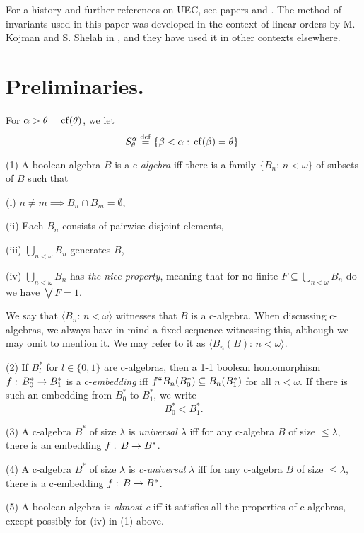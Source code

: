For a history and further references on UEC, see papers
\cite{Rudin} and \cite{Bell}. 
The method
of invariants used in this paper was developed in the context of linear orders
by M. Kojman and S. Shelah in \cite{KjSh 409}, and they have used it in other
contexts elsewhere.


\section{Preliminaries.}\label{basics}

\begin{Notation} For $\alpha>\theta={\rm cf}(\theta)$, we let
\[
S^\alpha_\theta\deq\{\beta<\alpha:\,\cf(\beta)=\theta\}.
\]
\end{Notation}

\begin{Definition}(1) A 
boolean algebra $B$ is a c-{\em algebra} iff there is
a family $\{ B_n:\,n<\omega\}$ of subsets of $B$ such that
\begin{description}
\item{(i)} $n\neq m\implies B_n\cap B_m=\emptyset$,
\item{(ii)} Each $B_n$ consists of pairwise disjoint elements,
\item{(iii)} $\bigcup_{n<\omega} B_n$ generates $B$,
\item{(iv)} $\bigcup_{n<\omega} B_n$ has {\em the nice property}, meaning
that for no finite $F\subseteq \bigcup_{n<\omega} B_n$ do we have $\bigvee F=1$.
\end{description}
We say that $\langle B_n:\,n<\omega\rangle$ witnesses that $B$ is a
c-algebra. When discussing c-algebras, we always have in mind a fixed sequence
witnessing this, although we may omit to mention it. We may refer to it as
$\langle B_n(B):\,n<\omega\rangle$.

\medskip

{\noindent (2)} If $B_l^\ast$ for $l\in \{0,1\}$ are c-algebras,
then a 1-1 boolean 
homomorphism $f:\,B_0^\ast\rightarrow B^\ast_1$ is a c-{\em embedding} iff
$f``B_n(B_0^\ast)\subseteq B_n(B_1^\ast)$ for all $n<\omega$. If there is
such an embedding from $B^\ast_0$ to $B^\ast_1$, we write 
\[
B_0^\ast<B^\ast_1.
\]

{\noindent (3)} A c-algebra $B^\ast$
of size $\lambda$ is {\em universal}
$\lambda$ iff for any c-algebra $B$ of size $\le\lambda$, there is an
embedding $f:\,B\rightarrow B^\ast$.

{\noindent (4)} A c-algebra $B^\ast$
of size $\lambda$ is {\em c-universal}
$\lambda$ iff for any c-algebra $B$ of size $\le\lambda$, there is a
c-embedding $f:\,B\rightarrow B^\ast$.

{\noindent (5)} A boolean algebra is {\em almost c} iff it satisfies
all the properties of c-algebras, except possibly for (iv) in (1) above.

\end{Definition}

